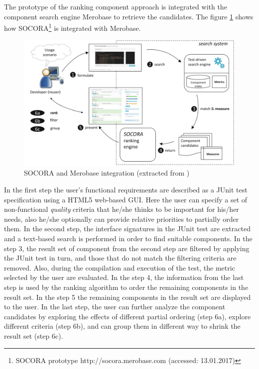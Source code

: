 The prototype of the ranking component approach is integrated with the component search engine Merobase to retrieve the candidates. The figure \ref{fig:socora-merobase} shows how SOCORA\footnote{SOCORA prototype http://socora.merobase.com (accessed: 13.01.2017)} is integrated with Merobase. 

\begin{figure}[ht]
	\centering
    \includegraphics[width=\textwidth]{grafiken/socora-merobase}
    \caption{SOCORA and Merobase integration (extracted from \cite{Kessel2016})}
    \label{fig:socora-merobase}
\end{figure}

In the first step the user's functional requirements are described as a JUnit test specification using a HTML5 web-based GUI. Here the user can specify a set of non-functional \textit{quality} criteria that he/she thinks to be important for his/her needs, also he/she optionally can provide relative priorities to partially order them. In the second step, the interface signatures in the JUnit test are extracted and a text-based search is performed in order to find suitable components. In the step 3, the result set of component from the second step are filtered by applying the JUnit test in turn, and those that do not match the filtering criteria are removed. Also, during the compilation and execution of the test, the metric selected by the user are evaluated. In the step 4, the information from the last step is used by the ranking algorithm to order the remaining components in the result set. In the step 5 the remaining components in the result set are displayed to the user. In the last step, the user can further analyze the component candidates by exploring the effects of different partial ordering (step 6a), explore different criteria (step 6b), and can group them in different way to shrink the result set (step 6c).

 

